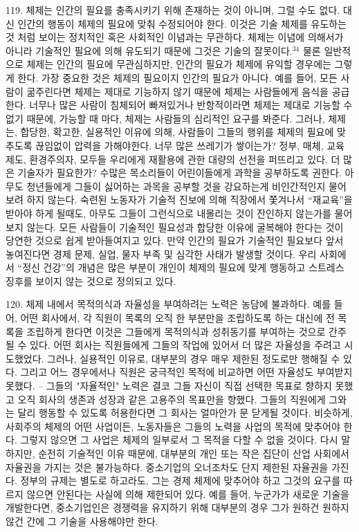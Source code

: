 \documentclass[11pt,a4paper]{article}
\begin{document}
\begin{multicols}{2}
119. 체제는 인간의 필요를 충족시키기 위해 존재하는 것이 아니며, 그럴 수도 없다. 대신 인간의 행동이  체제의 필요에 맞춰 수정되어야 한다. 이것은 기술 체제를 유도하는 것 처럼 보이는 정치적인 혹은  사회적인 이념과는 무관하다. 체제는 이념에 의해서가 아니라 기술적인 필요에 의해 유도되기 때문에  그것은 기술의 잘못이다.\hyperlink{34}{$^{34}$} 물론 일반적으로 체제는 인간의 필요에 무관심하지만, 인간의 필요가 체제에  유익할 경우에는 그렇게 한다. 가장 중요한 것은 체제의 필요이지 인간의 필요가 아니다. 예를 들어, 모든 사람이 굶주린다면 체제는 제대로 기능하지 않기 때문에 체제는 사람들에게 음식을 공급한다. 너무나  많은 사람이 침체되어 빠져있거나 반항적이라면 체제는 제대로 기능할 수 없기 때문에, 가능할 때 마다,  체제는 사람들의 심리적인 요구를 봐준다. 그러나, 체제는, 합당한, 확고한, 실용적인 이유에 의해,  사람들이 그들의 행위를 체제의 필요에 맞추도록 끊임없이 압력을 가해야한다. 너무 많은 쓰레기가  쌓이는가? 정부, 매체, 교육 제도, 환경주의자, 모두들 우리에게 재활용에 관한 대량의 선전을 퍼뜨리고  있다. 더 많은 기술자가 필요한가? 수많은 목소리들이 어린이들에게 과학을 공부하도록 권한다. 아무도  청년들에게 그들이 싫어하는 과목을 공부할 것을 강요하는게 비인간적인지 물어보려 하지 않는다. 
숙련된 노동자가 기술적 진보에 의해 직장에서 쫓겨나서 “재교육”을 받아야 하게 될때도, 아무도 그들이  그런식으로 내몰리는 것이 잔인하지 않는가를 물어보지 않는다. 모든 사람들이 기술적인 필요성과  합당한 이유에 굴복해야 한다는 것이 당연한 것으로 쉽게 받아들여지고 있다. 만약 인간의 필요가  기술적인 필요보다 앞서 놓여진다면 경제 문제, 실업, 물자 부족 및 심각한 사태가 발생할 것이다. 우리  사회에서 “정신 건강”의 개념은 많은 부분이 개인이 체제의 필요에 맞게 행동하고 스트레스 징후를  보이지 않는 것으로 정의되고 있다.


120. 체제 내에서 목적의식과 자율성을 부여하려는 노력은 농담에 불과하다. 예를 들어, 어떤 회사에서,  각 직원이 목록의 오직 한 부분만을 조립하도록 하는 대신에 전 목록을 조립하게 한다면 이것은 그들에게  목적의식과 성취동기를 부여하는 것으로 간주될 수 있다. 어떤 회사는 직원들에게 그들의 작업에 있어서  
더 많은 자율성을 주려고 시도했었다. 그러나, 실용적인 이유로, 대부분의 경우 매우 제한된 정도로만  행해질 수 있다. 그리고 어느 경우에서나 직원은 궁극적인 목적에 비교하면 어떤 자율성도 부여받지  못했다. -- 그들의 "자율적인" 노력은 결코 그들 자신이 직접 선택한 목표로 향하지 못했고 오직 회사의  생존과 성장과 같은 고용주의 목표만을 향했다. 그들의 직원에게 그와는 달리 행동할 수 있도록  허용한다면 그 회사는 얼마안가 문 닫게될 것이다. 비슷하게, 사회주의 체제의 어떤 사업이든, 노동자들은 그들의 노력을 사업의 목적에 맞추어야 한다. 그렇지 않으면 그 사업은 체제의 일부로서 그 목적을 다할  수 없을 것이다. 다시 말하지만, 순전히 기술적인 이유 때문에, 대부분의 개인 또는 작은 집단이 산업  사회에서 자율권을 가지는 것은 불가능하다. 중소기업의 오너조차도 단지 제한된 자율권을 가진다.  정부의 규제는 별도로 하고라도, 그는 경제 체제에 맞추어야 하고 그것의 요구를 따르지 않으면 안된다는  사실에 의해 제한되어 있다. 예를 들어, 누군가가 새로운 기술을 개발한다면, 중소기업인은 경쟁력을  유지하기 위해 대부분의 경우 그가 원하건 원하지 않건 간에 그 기술을 사용해야만 한다.  



\end{multicols}
\end{document}
